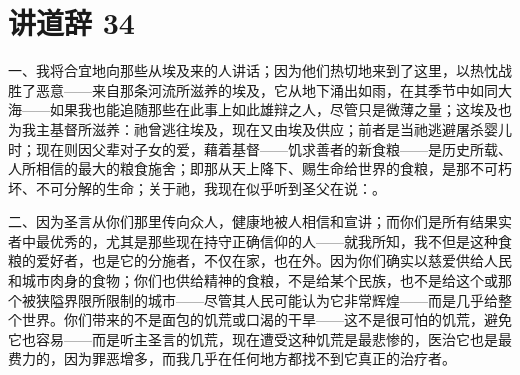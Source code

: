 

\section{讲道辞 34}

\par

\par

一、我将合宜地向那些从埃及来的人讲话；因为他们热切地来到了这里，以热忱战胜了恶意——来自那条河流所滋养的埃及，它从地下涌出如雨，在其季节中如同大海——如果我也能追随那些在此事上如此雄辩之人，尽管只是微薄之量；这埃及也为我主基督所滋养：祂曾逃往埃及，现在又由埃及供应；前者是当祂逃避屠杀婴儿时；现在则因父辈对子女的爱，藉着基督——饥求善者的新食粮——是历史所载、人所相信的最大的粮食施舍；即那从天上降下、赐生命给世界的食粮，是那不可朽坏、不可分解的生命；关于祂，我现在似乎听到圣父在说：。\par

二、因为圣言从你们那里传向众人，健康地被人相信和宣讲；而你们是所有结果实者中最优秀的，尤其是那些现在持守正确信仰的人——就我所知，我不但是这种食粮的爱好者，也是它的分施者，不仅在家，也在外。因为你们确实以慈爱供给人民和城市肉身的食物；你们也供给精神的食粮，不是给某个民族，也不是给这个或那个被狭隘界限所限制的城市——尽管其人民可能认为它非常辉煌——而是几乎给整个世界。你们带来的不是面包的饥荒或口渴的干旱——这不是很可怕的饥荒，避免它也容易——而是听主圣言的饥荒，现在遭受这种饥荒是最悲惨的，医治它也是最费力的，因为罪恶增多，而我几乎在任何地方都找不到它真正的治疗者。\par

